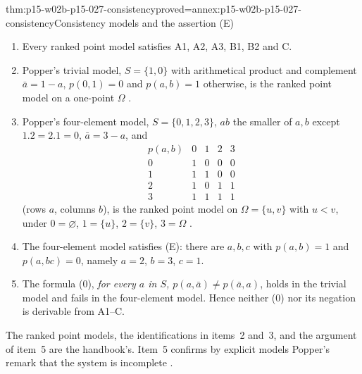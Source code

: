 \begin{hbtheorem}{thm:p15-w02b-p15-027-consistency}{proved=annex:p15-w02b-p15-027-consistency}{Consistency models and the assertion (E)}
\begin{enumerate}
\item Every ranked point model satisfies A1, A2, A3, B1, B2 and C.
\item Popper's trivial model, \(S=\{1,0\}\) with arithmetical product and
  complement \(\bar a=1-a\), \(p(0,1)=0\) and \(p(a,b)=1\) otherwise, is
  the ranked point model on a one-point \(\Omega\)
  \parencite[appendix~*iv, p.~342]{Popper2002LogicDiscoveryUI}.
\item Popper's four-element model, \(S=\{0,1,2,3\}\), \(ab\) the smaller
  of \(a,b\) except \(1.2=2.1=0\), \(\bar a=3-a\), and
  \[
  \begin{array}{c|cccc}
  p(a,b)&0&1&2&3\\\hline
  0&1&0&0&0\\
  1&1&1&0&0\\
  2&1&0&1&1\\
  3&1&1&1&1
  \end{array}
  \]
  (rows \(a\), columns \(b\)), is the ranked point model on
  \(\Omega=\{u,v\}\) with \(u<v\), under \(0=\varnothing\), \(1=\{u\}\),
  \(2=\{v\}\), \(3=\Omega\) \parencite[appendix~*iv,
  p.~343]{Popper2002LogicDiscoveryUI}.
\item The four-element model satisfies (E): there are \(a,b,c\) with
  \(p(a,b)=1\) and \(p(a,bc)=0\), namely \(a=2\), \(b=3\), \(c=1\).
\item The formula (0), \emph{for every \(a\) in \(S\),
  \(p(a,\bar a)\neq p(\bar a,a)\)}, holds in the trivial model and fails
  in the four-element model. Hence neither (0) nor its negation is
  derivable from A1--C.
\end{enumerate}
The ranked point models, the identifications in items~2 and~3, and the
argument of item~5 are the handbook's. Item~5 confirms by explicit models
Popper's remark that the system is incomplete
\parencite[appendix~*iv, note~1, pp.~329--330]{Popper2002LogicDiscoveryUI}.
\end{hbtheorem}

